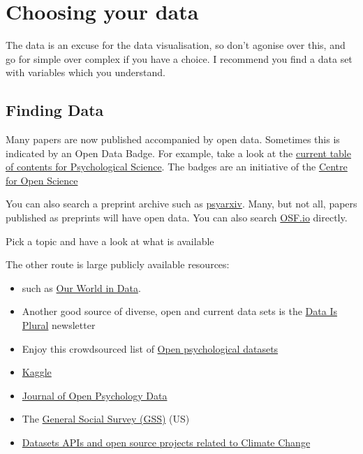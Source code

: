 \documentclass[
]{book}
\providecommand{\tightlist}{%
  \setlength{\itemsep}{0pt}\setlength{\parskip}{0pt}}
\begin{document}
\hypertarget{choosing-your-data}{%
\section{Choosing your data}\label{choosing-your-data}}

The data is an excuse for the data visualisation, so don't agonise over this, and go for simple over complex if you have a choice. I recommend you find a data set with variables which you understand.

\hypertarget{finding-data}{%
\subsection{Finding Data}\label{finding-data}}

Many papers are now published accompanied by open data. Sometimes this is indicated by an Open Data Badge. For example, take a look at the \href{https://journals.sagepub.com/toc/pss/current}{current table of contents for Psychological Science}. The badges are an initiative of the \href{https://cos.io/our-services/open-science-badges/}{Centre for Open Science}

You can also search a preprint archive such as \href{https://psyarxiv.com/}{psyarxiv}. Many, but not all, papers published as preprints will have open data. You can also search \href{https://osf.io/}{OSF.io} directly.

Pick a topic and have a look at what is available

The other route is large publicly available resources:

\begin{itemize}
\tightlist
\item
  such as \href{https://ourworldindata.org/}{Our World in Data}.
\item
  Another good source of diverse, open and current data sets is the \href{http://tinyletter.com/data-is-plural/archive}{Data Is Plural} newsletter
\item
  Enjoy this crowdsourced list of \href{https://docs.google.com/spreadsheets/d/1ejOJTNTL5ApCuGTUciV0REEEAqvhI2Rd2FCoj7afops/edit\#gid=0}{Open psychological datasets}
\item
  \href{https://www.kaggle.com/}{Kaggle}
\item
  \href{https://openpsychologydata.metajnl.com/articles/}{Journal of Open Psychology Data}
\item
  The \href{https://gss.norc.org/get-the-data}{General Social Survey (GSS)} (US)
\item
  \href{https://github.com/KKulma/climate-change-data}{Datasets APIs and open source projects related to Climate Change}
\end{itemize}
\end{document}
